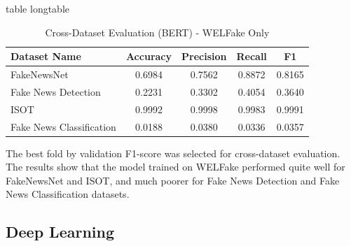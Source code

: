 \documentclass[stu,12pt,floatsintext,donotrepeattitle]{apa7}
\makeatletter
\let\origcaption\caption
\newcommand{\@tabletype}{table}
\newcommand{\@longtabletype}{longtable}
\DeclareRobustCommand{\caption}[2][]{%
    \ifx\relax#1\relax
      \origcaption{#2}%
      \def\temp@cap{#2}%
    \else
      \origcaption[#1]{#2}%
      \def\temp@cap{#1}%
    \fi
    \ifx\@captype\@tabletype
      \ifx\@currenvir\@longtabletype\else
        \addcontentsline{lot}{table}{\protect\numberline{\thetable}{\ignorespaces\temp@cap}}%
      \fi
    \fi
  }%
\let\oldcaption\caption
\renewcommand{\caption}[2][]{%
    \oldcaption[#1]{#2}%
    \vspace{-12pt}%
  }%
\makeatother
\begin{document}
\begin{table}[H]
    \centering
    \setlength{\tabcolsep}{3pt}
    \renewcommand{\arraystretch}{1.3}
    \caption{Cross-Dataset Evaluation (BERT) - WELFake Only}
    \label{tab:bert_cross_results}
    \begin{tabular}{@{} l c c c c @{}}
        \toprule
        \textbf{Dataset Name} & \textbf{Accuracy} & \textbf{Precision} & \textbf{Recall} & \textbf{F1} \\
        \midrule
        FakeNewsNet & 0.6984 & 0.7562 & 0.8872 & 0.8165 \\
        Fake News Detection & 0.2231 & 0.3302 & 0.4054 & 0.3640 \\
        ISOT & 0.9992 & 0.9998 & 0.9983 & 0.9991 \\
        Fake News Classification & 0.0188 & 0.0380 & 0.0336 & 0.0357 \\
        \bottomrule
    \end{tabular}
\end{table}

The best fold by validation F1-score was selected for cross-dataset evaluation. The results show that the model trained on WELFake performed quite well for FakeNewsNet and ISOT, and much poorer for Fake News Detection and Fake News Classification datasets. 

\subsection{Deep Learning}
\end{document}
